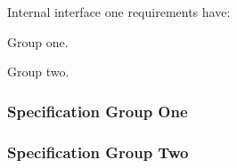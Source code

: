 Internal interface one requirements have:

\begin{my_enumerate}
	\item Group one.
	\item Group two.
\end{my_enumerate}

\renewcommand{\ThisSegment}{Acoustic Array and Lower Spreader\xspace}

\KNEADSUBSUBSECTIONNEWPAGE
\subsubsection{Specification Group One}
\label{loc:IIF_TwoGroupOne}



\KNEADSUBSUBSECTIONNEWPAGE
\subsubsection{Specification Group Two}
\label{loc:IIF_TwoGroupTwo}

